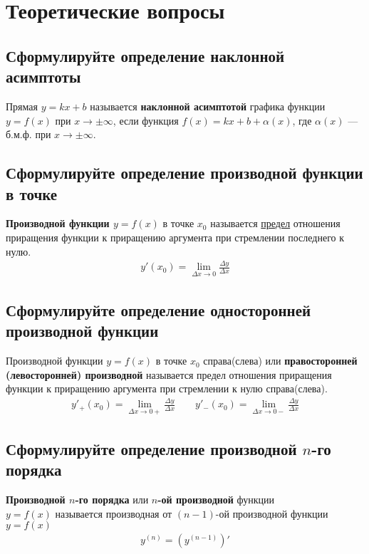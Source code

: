 


\tableofcontents
\newpage
\section{Теоретические вопросы}
\subsection{Сформулируйте определение наклонной асимптоты}
\begin{definition}
	Прямая $y=kx+b$ называется \textbf{наклонной асимптотой} графика функции $y=f(x)$ при $x \to \pm \infty$, если функция $f(x) = kx+b + \alpha(x)$, где $\alpha(x)$ --- б.м.ф. при $x\to \pm \infty$.
\end{definition}

\subsection{Сформулируйте определение производной функции в точке}
\begin{definition}
	\textbf{Производной функции $y = f(x)$} в точке $x_0$ называется \underline{предел} отношения приращения функции к приращению аргумента при стремлении последнего к нулю.
	\begin{align*}
		\boxed{y'(x_0) = \lim\limits_{\Delta x \to 0} \frac{\Delta y}{\Delta x}}
	\end{align*}
\end{definition}

\subsection{Сформулируйте определение односторонней производной функции}
\begin{definition}
	Производной функции $y=f(x)$ в точке $x_0$ справа(слева) или \textbf{правосторонней (левосторонней) производной} называется предел отношения приращения функции к приращению аргумента при стремлении к нулю справа(слева).
	\begin{gather*}
		\boxed{y'_+(x_0) = \lim\limits_{\Delta x \to 0+} \frac{\Delta y}{\Delta x}} \qquad \boxed{y'_-(x_0) = \lim\limits_{\Delta x \to 0-} \frac{\Delta y}{\Delta x}}
	\end{gather*}
\end{definition}

\subsection{Сформулируйте определение производной $n$-го порядка}
\begin{definition}
	\textbf{Производной $n$-го порядка} или \textbf{$n$-ой производной} функции \\ $y=f(x)$ называется производная от $(n-1)$-ой производной функции $y=f(x)$
	\begin{align*}
		\boxed{y^{(n)} = \left( y^{(n-1)} \right)'}
	\end{align*}
\end{definition}


